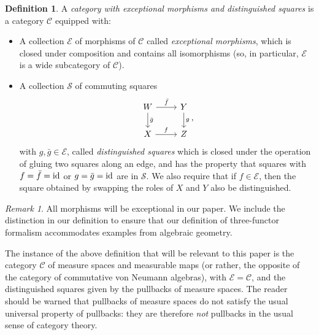 \documentclass[10pt,a4paper,oneside]{amsart}
\theoremstyle{remark}
\newtheorem{remark}[theorem]{Remark}
\theoremstyle{definition}
\newtheorem{definition}[theorem]{Definition}
\newcommand{\id}{\textnormal{id}}
\begin{document}
\begin{definition}
    A \emph{category with exceptional morphisms and distinguished squares} is a category $\mathcal{C}$ equipped with:
\begin{itemize}
    \item A collection $\mathcal{E}$ of morphisms of $\mathcal{C}$ called \emph{exceptional morphisms}, which is closed under composition and contains all isomorphisms (so, in particular, $\mathcal{E}$ is a wide subcategory of $ \mathcal{C}$).
    \item
    A collection $\mathcal{S}$ of commuting squares
\begin{equation}\label{eq:distinguishedsquare}
	\begin{tikzcd}
		W \arrow[d,"\bar{g}"] \arrow[r,"\bar{f}"] &Y\arrow[d,"g"] \\
		X \arrow[r,"f"] & Z
	\end{tikzcd},
\end{equation}
with $g,\bar{g}\in \mathcal{E}$, 
called \emph{distinguished squares} which is closed under the operation of gluing two squares along an edge, and has the property that squares with $f=\bar{f}=\id $ or $g=\bar{g}=\id$ are in $\mathcal{S}$.
We also require that if $f\in\mathcal E$, then
the square obtained by swapping the roles of $X$ and $Y$ also be distinguished.
\end{itemize}
\end{definition}

\begin{remark}
All morphisms will be exceptional in our paper. We include the distinction in our definition to ensure that our definition of three-functor formalism accommodates examples from algebraic geometry.
\end{remark}

The instance of the above definition
that will be relevant to this paper is the category $\mathcal C$ of measure spaces and measurable maps
(or rather, the opposite of the category of commutative von Neumann algebras), with $\mathcal E=\mathcal C$,
and the distinguished squares given by the pullbacks of measure spaces.
The reader should be warned that pullbacks of measure spaces do not satisfy the usual universal property of pullbacks: they are therefore \emph{not} pullbacks in the usual sense of category theory.\medskip
\end{document}
